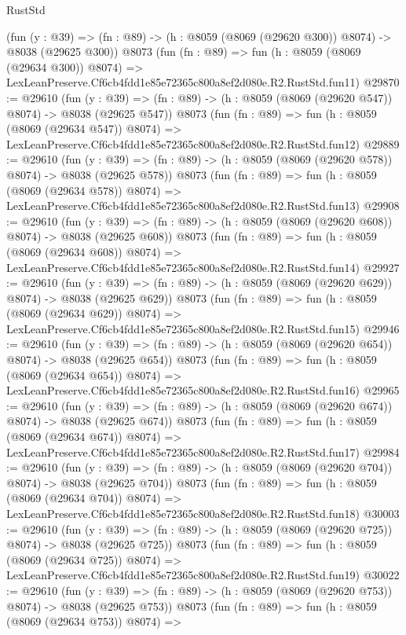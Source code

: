 \begin{lexlean}{RustStd}
\begin{coremodule}
    (fun (y : @39) => (fn : @89) -> (h : @8059 (@8069 (@29620 @300)) @8074) -> @8038 (@29625 @300))
    @8073
    (fun (fn : @89) =>
    fun (h : @8059 (@8069 (@29634 @300)) @8074) =>
    LexLeanPreserve.Cf6cb4fdd1e85e72365c800a8ef2d080e.R2.RustStd.fun11)
@29870 := @29610
    (fun (y : @39) => (fn : @89) -> (h : @8059 (@8069 (@29620 @547)) @8074) -> @8038 (@29625 @547))
    @8073
    (fun (fn : @89) =>
    fun (h : @8059 (@8069 (@29634 @547)) @8074) =>
    LexLeanPreserve.Cf6cb4fdd1e85e72365c800a8ef2d080e.R2.RustStd.fun12)
@29889 := @29610
    (fun (y : @39) => (fn : @89) -> (h : @8059 (@8069 (@29620 @578)) @8074) -> @8038 (@29625 @578))
    @8073
    (fun (fn : @89) =>
    fun (h : @8059 (@8069 (@29634 @578)) @8074) =>
    LexLeanPreserve.Cf6cb4fdd1e85e72365c800a8ef2d080e.R2.RustStd.fun13)
@29908 := @29610
    (fun (y : @39) => (fn : @89) -> (h : @8059 (@8069 (@29620 @608)) @8074) -> @8038 (@29625 @608))
    @8073
    (fun (fn : @89) =>
    fun (h : @8059 (@8069 (@29634 @608)) @8074) =>
    LexLeanPreserve.Cf6cb4fdd1e85e72365c800a8ef2d080e.R2.RustStd.fun14)
@29927 := @29610
    (fun (y : @39) => (fn : @89) -> (h : @8059 (@8069 (@29620 @629)) @8074) -> @8038 (@29625 @629))
    @8073
    (fun (fn : @89) =>
    fun (h : @8059 (@8069 (@29634 @629)) @8074) =>
    LexLeanPreserve.Cf6cb4fdd1e85e72365c800a8ef2d080e.R2.RustStd.fun15)
@29946 := @29610
    (fun (y : @39) => (fn : @89) -> (h : @8059 (@8069 (@29620 @654)) @8074) -> @8038 (@29625 @654))
    @8073
    (fun (fn : @89) =>
    fun (h : @8059 (@8069 (@29634 @654)) @8074) =>
    LexLeanPreserve.Cf6cb4fdd1e85e72365c800a8ef2d080e.R2.RustStd.fun16)
@29965 := @29610
    (fun (y : @39) => (fn : @89) -> (h : @8059 (@8069 (@29620 @674)) @8074) -> @8038 (@29625 @674))
    @8073
    (fun (fn : @89) =>
    fun (h : @8059 (@8069 (@29634 @674)) @8074) =>
    LexLeanPreserve.Cf6cb4fdd1e85e72365c800a8ef2d080e.R2.RustStd.fun17)
@29984 := @29610
    (fun (y : @39) => (fn : @89) -> (h : @8059 (@8069 (@29620 @704)) @8074) -> @8038 (@29625 @704))
    @8073
    (fun (fn : @89) =>
    fun (h : @8059 (@8069 (@29634 @704)) @8074) =>
    LexLeanPreserve.Cf6cb4fdd1e85e72365c800a8ef2d080e.R2.RustStd.fun18)
@30003 := @29610
    (fun (y : @39) => (fn : @89) -> (h : @8059 (@8069 (@29620 @725)) @8074) -> @8038 (@29625 @725))
    @8073
    (fun (fn : @89) =>
    fun (h : @8059 (@8069 (@29634 @725)) @8074) =>
    LexLeanPreserve.Cf6cb4fdd1e85e72365c800a8ef2d080e.R2.RustStd.fun19)
@30022 := @29610
    (fun (y : @39) => (fn : @89) -> (h : @8059 (@8069 (@29620 @753)) @8074) -> @8038 (@29625 @753))
    @8073
    (fun (fn : @89) =>
    fun (h : @8059 (@8069 (@29634 @753)) @8074) =>

\end{coremodule}
\end{lexlean}
